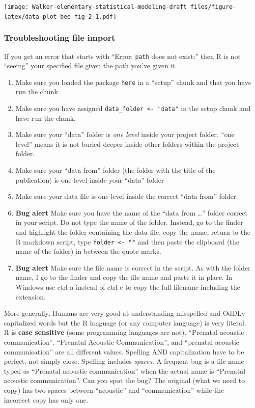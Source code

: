 \documentclass[]{book}
\providecommand{\tightlist}{%
  \setlength{\itemsep}{0pt}\setlength{\parskip}{0pt}}
\begin{document}
\texttt{[image: Walker-elementary-statistical-modeling-draft\_files/figure-latex/data-plot-bee-fig-2-1.pdf]}

\hypertarget{troubleshooting-file-import}{%
\subsubsection{Troubleshooting file import}\label{troubleshooting-file-import}}

If you get an error that starts with ``Error: \texttt{path} does not exist:'' then R is not ``seeing'' your specified file given the path you've given it.

\begin{enumerate}
\def\labelenumi{\arabic{enumi}.}
\tightlist
\item
  Make sure you loaded the package \texttt{here} in a ``setup'' chunk and that you have run the chunk
\item
  Make sure you have assigned \texttt{data\_folder\ \textless{}-\ "data"} in the setup chunk and have run the chunk.
\item
  Make sure your ``data'' folder is \emph{one level} inside your project folder. ``one level'' means it is not buried deeper inside other folders within the project folder.
\item
  Make sure your ``data from'' folder (the folder with the title of the publication) is one level inside your ``data'' folder
\item
  Make sure your data file is one level inside the correct ``data from'' folder.
\item
  \textbf{Bug alert} Make sure you have the name of the ``data from \ldots{}'' folder correct in your script. Do not type the name of the folder. Instead, go to the finder and highlight the folder containing the data file, copy the name, return to the R markdown script, type \texttt{folder\ \textless{}-\ ""} and then paste the clipboard (the name of the folder) in between the quote marks.
\item
  \textbf{Bug alert} Make sure the file name is correct in the script. As with the folder name, I go to the finder and copy the file name and paste it in place. In Windows use ctrl-a instead of ctrl-c to copy the full filename including the extension.
\end{enumerate}

More generally, Humans are very good at understanding misspelled and OdDLy capitalized words but the R language (or any computer language) is very literal. R is \textbf{case sensitive} (some programming languages are not). ``Prenatal acoustic communication'', ``Prenatal Acoustic Communication'', and ``prenatal acoustic communication'' are all different values. Spelling AND capitalization have to be perfect, not simply close. Spelling includes \emph{spaces}. A frequent bug is a file name typed as ``Prenatal acoustic communication'' when the actual name is ``Prenatal acoustic communication''. Can you spot the bug? The original (what we need to copy) has two spaces between ``acoustic'' and ``communication'' while the incorrect copy has only one.
\end{document}
